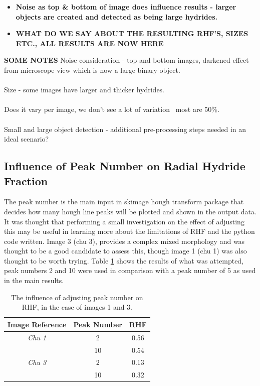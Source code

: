 \documentclass{article}
\begin{document}
    \begin{itemize}
        \item \textbf{Noise as top \& bottom of image does influence results - larger objects are created and detected as being large hydrides.}
        \item \textbf{WHAT DO WE SAY ABOUT THE RESULTING RHF'S, SIZES ETC., ALL RESULTS ARE NOW HERE}
    \end{itemize}
    
    \textbf{SOME NOTES}
    Noise consideration - top and bottom images, darkened effect from microscope view which is now a large binary object.
    \\
    \\
    Size - some images have larger and thicker hydrides.
    \\
    \\
    Does it vary per image, we don't see a lot of variation ~most are 50\%.
    \\
    \\
    Small and large object detection - additional pre-processing steps needed in an ideal scenario?

\subsection{Influence of Peak Number on Radial Hydride Fraction}

    The peak number is the main input in skimage hough transform package that decides how many hough line peaks will be plotted and shown in the output data. It was thought that performing a small investigation on the effect of adjusting this may be useful in learning more about the limitations of RHF and the python code written. Image 3 (chu 3), provides a complex mixed morphology and was thought to be a good candidate to assess this, though image 1 (chu 1) was also thought to be worth trying. Table \ref{tab:peakno_tests} shows the results of what was attempted, peak numbers 2 and 10 were used in comparison with a peak number of 5 as used in the main results.

    \begin{table}[h]
        \centering
        \begin{tabular}{|c|c|c|}
        \hline
        \multicolumn{1}{|l|}{\textbf{Image Reference}} & \textbf{Peak Number} & \textbf{RHF} \\ \hline
        \multirow{}{}{\textit{Chu 1}}                & 2                    & 0.56         \\ 
                                                      & 10                   & 0.54         \\ \hline
        \multirow{}{}{\textit{Chu 3}}                & 2                    & 0.13         \\ 
                                                      & 10                   & 0.32         \\ \hline
        \end{tabular}
        \caption{The influence of adjusting peak number on RHF, in the case of images 1 and 3.}
        \label{tab:peakno_tests}
    \end{table}
    
\end{document}
